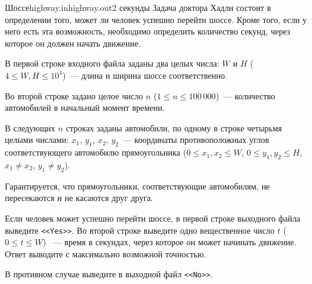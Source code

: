 \begin{problem}{Шоссе}{highway.in}{highway.out}{2 секунды}
Задача доктора Хадли состоит в определении того, может ли человек успешно перейти шоссе. Кроме того, если у него есть эта возможность, необходимо 
определить количество секунд, через которое он должен начать движение.

\InputFile
В первой строке входного файла заданы два целых числа: $W$ и $H$ ($4 \le W, H \le 10^4$)~--- длина и ширина шоссе соответственно.

Во второй строке задано целое число $n$ ($1 \le n \le 100{\,}000$)~--- количество автомобилей в начальный момент времени.

В следующих $n$ строках заданы автомобили, по одному в строке четырьмя целыми числами: $x_1$, $y_1$, $x_2$, $y_2$~--- 
координаты противоположных углов соответствующего автомобилю прямоугольника ($0 \le x_1, x_2 \le W$, $0 \le y_1, y_2 \le H$, $x_1 \neq x_2$, 
$y_1 \neq y_2$).

Гарантируется, что прямоугольники, соответствующие автомобилям, не пересекаются и не касаются друг друга.

\OutputFile               

Если человек может успешно перейти шоссе, в первой строке выходного файла выведите \texttt{<<Yes>>}. Во второй строке выведите одно вещественное число 
$t$ ($0 \le t \le W$) ~--- время в секундах, через которое он может начинать движение. Ответ выводите с максимально возможной точностью.

В противном случае выведите в выходной файл \texttt{<<No>>}.

\Examples
\begin{example}%
%
\end{example}
\end{problem}
